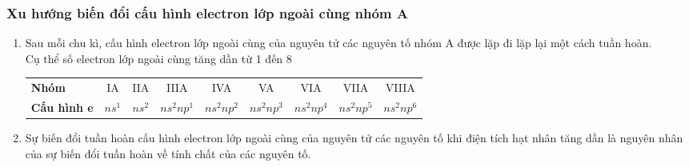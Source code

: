 	\subsubsection{Xu hướng biến đổi cấu hình electron lớp ngoài cùng nhóm A}
\vspace{0.25 cm}
\begin{tomtat}
	\begin{enumerate}
		\item Sau mỗi chu kì, cấu hình electron lớp ngoài cùng của nguyên tử các nguyên tố nhóm A được lặp đi lặp lại một cách tuần hoàn.\\
		Cụ thể số electron lớp ngoài cùng tăng dần từ 1 đến 8
		\begin{center}
			\begin{tabular}{|l*{8}{c}|}
				\hline
				\textbf{Nhóm} &IA&IIA&IIIA&IVA&VA&VIA&VIIA&VIIIA\\
				\textbf{Cấu hình e}& $ns^1$&$ns^2$&$ns^2np^1$&$ns^2np^2$&$ns^2np^3$&$ns^2np^4$&$ns^2np^5$&$ns^2np^6$\\
				\hline
			\end{tabular}
		\end{center}
		\item Sự biến đổi tuần hoàn cấu hình electron lớp ngoài cùng của nguyên tử các nguyên tố khi điện tích hạt nhân tăng dần là nguyên nhân của sự biến đổi tuần hoàn về tính chất của các nguyên tố.
	\end{enumerate}
\end{tomtat}
